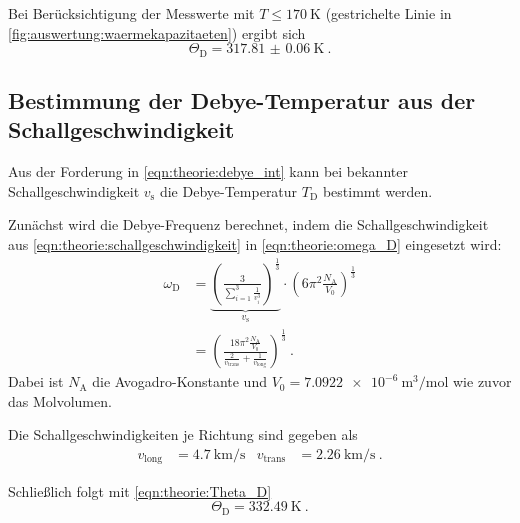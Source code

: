 Bei Berücksichtigung der Messwerte mit $T \leq \SI{170}{\kelvin}$ (gestrichelte Linie in \autoref{fig:auswertung:waermekapazitaeten})
ergibt sich
\[
    \Theta_\text{D} = \SI{317.81(6)}{\kelvin} \ .
\]


\subsection{Bestimmung der Debye-Temperatur aus der Schallgeschwindigkeit}
\label{sec:auswertung:debye_vs}
Aus der Forderung in \autoref{eqn:theorie:debye_int}
kann bei bekannter Schallgeschwindigkeit $v_\text{s}$ die Debye-Temperatur $T_\text{D}$ bestimmt werden.

Zunächst wird die Debye-Frequenz berechnet,
indem die Schallgeschwindigkeit aus \autoref{eqn:theorie:schallgeschwindigkeit}
in \autoref{eqn:theorie:omega_D} eingesetzt wird:
\begin{align*}
    \omega_\text{D} &= \underbrace{\left( \frac{3}{\sum_{i=1}^3 \frac{1}{v^3_i}} \right)^\frac{1}{3}}_{v_\text{s}}
    \cdot \left(6 \pi^2 \frac{N_\text{A}}{V_0}\right)^{\frac{1}{3}}
    \\
    &= \left( \frac{18 \pi^2 \frac{N_\text{A}}{V_0}}{\frac{2}{v_\text{trans}} + \frac{1}{v_\text{long}}} \right)^\frac{1}{3} \ .
\end{align*}
Dabei ist $N_\text{A}$ die Avogadro-Konstante und $V_0 = \SI{7.0922e-6}{\cubic\meter\per\mol}$ \cite{periodictable} wie zuvor das Molvolumen.

Die Schallgeschwindigkeiten je Richtung sind gegeben \cite{versuchsanleitung} als
\begin{align*}
    v_\text{long} &= \SI{4.7}{\kilo\meter\per\second}
    &
    v_\text{trans} &= \SI{2.26}{\kilo\meter\per\second} \ .
\end{align*}

Schließlich folgt mit \autoref{eqn:theorie:Theta_D}
\[
    \Theta_\text{D} = \SI{332.49}{\kelvin} \ .
\]

